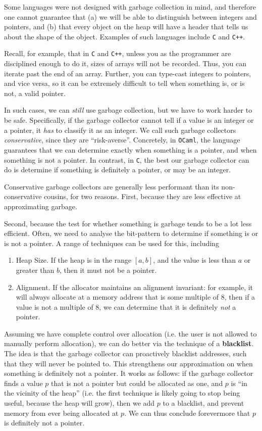 Some languages were not designed with garbage collection in mind, and therefore one cannot guarantee that (a) we will be able to distinguish between integers and pointers, and (b) that every object on the heap will have a header that tells us about the shape of the object. Examples of such languages include \texttt{C} and \texttt{C++}. 

Recall, for example, that in \texttt{C} and \texttt{C++}, unless you as the programmer are disciplined enough to do it, sizes of arrays will not be recorded. Thus, you can iterate past the end of an array. Further, you can type-cast integers to pointers, and vice versa, so it can be extremely difficult to tell when something is, or is not, a valid pointer. 

In such cases, we can \textit{still} use garbage collection, but we have to work harder to be safe. Specifically, if the garbage collector cannot tell if a value is an integer or a pointer, it \textit{has} to classify it as an integer. We call such garbage collectors \textit{conservative}, since they are ``risk-averse''. Concretely, in \texttt{OCaml}, the language guarantees that we can determine exactly when something is a pointer, and when something is not a pointer. In contrast, in \texttt{C}, the best our garbage collector can do is determine if something is definitely a pointer, or may be an integer. 

Conservative garbage collectors are generally less performant than its non-conservative cousins, for two reasons. First, because they are less effective at approximating garbage.

Second, because the test for whether something is garbage tends to be a lot less efficient. Often, we need to analyse the bit-pattern to determine if something is or is not a pointer. A range of techniques can be used for this, including

\begin{enumerate}
    \item Heap Size. If the heap is in the range $[a, b]$, and the value is less than $a$ or greater than $b$, then it must not be a pointer.
    \item Alignment. If the allocator maintains an alignment invariant: for example, it will always allocate at a memory address that is some multiple of 8, then if a value is not a multiple of 8, we can determine that it is definitely \textit{not} a pointer.
\end{enumerate}

Assuming we have complete control over allocation (i.e. the user is not allowed to manually perform allocation), we can do better via the technique of a \textbf{blacklist}. The idea is that the garbage collector can proactively blacklist addresses, such that they will never be pointed to. This strengthens our approximation on when something is definitely not a pointer. It works as follows: if the garbage collector finds a value $p$ that is not a pointer but could be allocated as one, and $p$ is ``in the vicinity of the heap'' (i.e. the first technique is likely going to stop being useful, because the heap will grow), then we add $p$ to a blacklist, and prevent memory from ever being allocated at $p$. We can thus conclude forevermore that $p$ is definitely not a pointer. 

